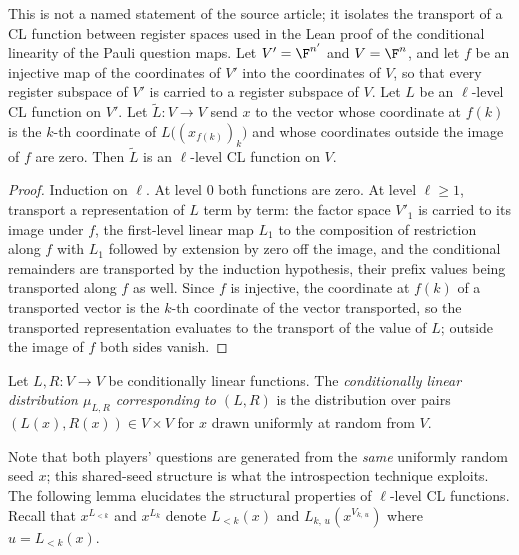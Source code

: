 \begin{lemma}\label{lem:cl-reindex}
	\leanok
	This is not a named statement of the source article; it isolates the transport of a CL function between register spaces used in the Lean proof of the conditional linearity of the Pauli question maps. Let $V' = \F^{n'}$ and $V = \F^{n}$, and let $f$ be an injective map of the coordinates of $V'$ into the coordinates of $V$, so that every register subspace of $V'$ is carried to a register subspace of $V$. Let $L$ be an $\ell$-level CL function on $V'$. Let $\tilde L \colon V \to V$ send $x$ to the vector whose coordinate at $f(k)$ is the $k$-th coordinate of $L\bigl( (x_{f(k)})_k \bigr)$ and whose coordinates outside the image of $f$ are zero. Then $\tilde L$ is an $\ell$-level CL function on $V$.
\end{lemma}
\begin{proof}
	\leanok
	Induction on $\ell$. At level $0$ both functions are zero. At level $\ell \ge 1$, transport a representation of $L$ term by term: the factor space $V'_1$ is carried to its image under $f$, the first-level linear map $L_1$ to the composition of restriction along $f$ with $L_1$ followed by extension by zero off the image, and the conditional remainders are transported by the induction hypothesis, their prefix values being transported along $f$ as well. Since $f$ is injective, the coordinate at $f(k)$ of a transported vector is the $k$-th coordinate of the vector transported, so the transported representation evaluates to the transport of the value of $L$; outside the image of $f$ both sides vanish.
\end{proof}

\begin{definition}\label{def:cl-dist}
	Let $L, R \colon V \to V$ be conditionally linear functions. The \emph{conditionally linear distribution $\mu_{L,R}$ corresponding to $(L,R)$} is the distribution over pairs $(L(x), R(x)) \in V \times V$ for $x$ drawn uniformly at random from $V$.
\end{definition}

Note that both players' questions are generated from the \emph{same} uniformly random seed $x$; this shared-seed structure is what the introspection technique exploits. The following lemma elucidates the structural properties of $\ell$-level CL functions. Recall that $x^{L_{<k}}$ and $x^{L_k}$ denote $L_{<k}(x)$ and $L_{k,\,u}(x^{V_{k,\,u}})$ where $u = L_{<k}(x)$.

